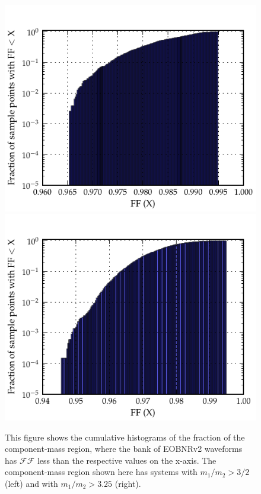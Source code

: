 \documentclass[aps,
prd,
amsmath,
amssymb,
twocolumn,
floatfix,
groupedaddress]{revtex4-1}
\newcommand{\FF}{\mathcal{FF}}
\begin{document}
\begin{figure}
\centerline{
\includegraphics[scale=0.04, clip=false,keepaspectratio=true, width=\columnwidth]{EOBHMvsEOB22cutcumhist.pdf}
\includegraphics[scale=0.04, clip=false, keepaspectratio=true, width=\columnwidth]{EOBHMvsEOB22FULLcumhist15pc.pdf}
}
\caption{\label{fig:cumhist_eob22eobhm_cuteta23}This figure shows the cumulative histograms of the fraction of the component-mass region, where the bank of EOBNRv2 waveforms has $\FF$ less than the respective values on the x-axis. The component-mass region shown here has systems with $m_1/m_2>3/2$ (left) and with $m_1/m_2>3.25$ (right).}
\end{figure}
\end{document}
